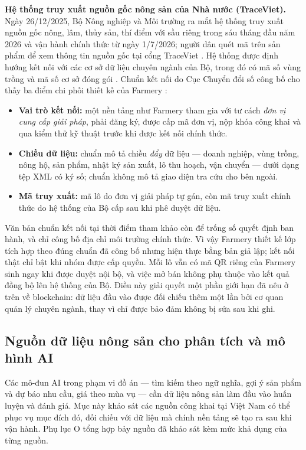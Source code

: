 \noindent\textbf{Hệ thống truy xuất nguồn gốc nông sản của Nhà nước (TraceViet).} Ngày 26/12/2025, Bộ Nông nghiệp và Môi trường ra mắt hệ thống truy xuất nguồn gốc nông, lâm, thủy sản, thí điểm với sầu riêng trong sáu tháng đầu năm 2026 và vận hành chính thức từ ngày 1/7/2026; người dân quét mã trên sản phẩm để xem thông tin nguồn gốc tại cổng TraceViet \parencite{tuoitre_traceviet_2025}. Hệ thống được định hướng kết nối với các cơ sở dữ liệu chuyên ngành của Bộ, trong đó có mã số vùng trồng và mã số cơ sở đóng gói \parencite{mae_traceviet_2026}. Chuẩn kết nối do Cục Chuyển đổi số công bố cho thấy ba điểm chi phối thiết kế của Farmery \parencite{traceviet_chuanketnoi}:
\begin{itemize}
    \item \textbf{Vai trò kết nối:} một nền tảng như Farmery tham gia với tư cách \emph{đơn vị cung cấp giải pháp}, phải đăng ký, được cấp mã đơn vị, nộp khóa công khai và qua kiểm thử kỹ thuật trước khi được kết nối chính thức.
    \item \textbf{Chiều dữ liệu:} chuẩn mô tả chiều \emph{đẩy} dữ liệu --- doanh nghiệp, vùng trồng, nông hộ, sản phẩm, nhật ký sản xuất, lô thu hoạch, vận chuyển --- dưới dạng tệp XML có ký số; chuẩn không mô tả giao diện tra cứu cho bên ngoài.
    \item \textbf{Mã truy xuất:} mã lô do đơn vị giải pháp tự gán, còn mã truy xuất chính thức do hệ thống của Bộ cấp sau khi phê duyệt dữ liệu.
\end{itemize}
Văn bản chuẩn kết nối tại thời điểm tham khảo còn để trống số quyết định ban hành, và chỉ công bố địa chỉ môi trường chính thức. Vì vậy Farmery thiết kế lớp tích hợp theo đúng chuẩn đã công bố nhưng hiện thực bằng bản giả lập; kết nối thật chỉ bật khi nhóm được cấp quyền. Mỗi lô vẫn có mã QR riêng của Farmery sinh ngay khi được duyệt nội bộ, và việc mở bán không phụ thuộc vào kết quả đồng bộ lên hệ thống của Bộ. Điều này giải quyết một phần giới hạn đã nêu ở trên về blockchain: dữ liệu đầu vào được đối chiếu thêm một lần bởi cơ quan quản lý chuyên ngành, thay vì chỉ được bảo đảm không bị sửa sau khi ghi.

\subsection{Nguồn dữ liệu nông sản cho phân tích và mô hình AI}
\label{subsec:nguondulieunongsan}

Các mô-đun AI trong phạm vi đồ án --- tìm kiếm theo ngữ nghĩa, gợi ý sản phẩm và dự báo nhu cầu, giá theo mùa vụ --- cần dữ liệu nông sản làm đầu vào huấn luyện và đánh giá. Mục này khảo sát các nguồn công khai tại Việt Nam có thể phục vụ mục đích đó, đối chiếu với dữ liệu mà chính nền tảng sẽ tạo ra sau khi vận hành. Phụ lục O tổng hợp bảy nguồn đã khảo sát kèm mức khả dụng của từng nguồn.

